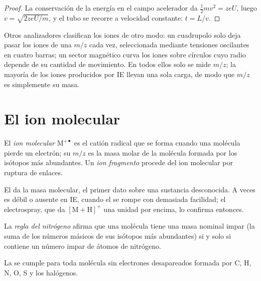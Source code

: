 \begin{proof}
La conservación de la energía en el campo acelerador da $\tfrac12mv^2 = zeU$, luego $v = \sqrt{2zeU/m}$, y
el tubo se recorre a velocidad constante: $t = L/v$.
\end{proof}

Otros analizadores clasifican los iones de otro modo: un cuadrupolo solo deja pasar los iones de una $m/z$ cada vez,
seleccionada mediante tensiones oscilantes en cuatro barras; un sector magnético curva los iones sobre círculos cuyo radio
depende de su cantidad de movimiento. En todos ellos solo se mide $m/z$; la mayoría de los iones producidos por IE llevan una sola
carga, de modo que $m/z$ es simplemente su masa.

\section{El ion molecular}

\begin{definition}\label{def:b2:mass-spec-atomic:molecular-ion}
El \emph{ion molecular} $\mathrm M^{+\bullet}$ es el catión radical que se forma cuando una
molécula pierde un electrón; su $m/z$ es la masa molar de la molécula formada por los isótopos más
abundantes. Un \emph{ion fragmento} procede del ion molecular por ruptura de
enlaces.
\end{definition}

El  da la masa molecular, el primer dato sobre una sustancia desconocida. A veces es débil o
ausente en IE, cuando el  se rompe con demasiada facilidad; el electrospray, que da $[\mathrm M +
\mathrm H]^+$ una unidad por encima, lo confirma entonces.

\begin{definition}\label{def:b2:mass-spec-atomic:nitrogen-rule}
La \emph{regla del nitrógeno} afirma que una molécula tiene una masa nominal impar (la suma
de los números másicos de sus isótopos más abundantes) si y solo si contiene un número impar de átomos de
nitrógeno.
\end{definition}

\begin{proposition}\label{prop:b2:mass-spec-atomic:nitrogen-rule}
La  se cumple para toda molécula sin electrones desapareados formada por C, H, N, O, S y los
halógenos.
\end{proposition}

